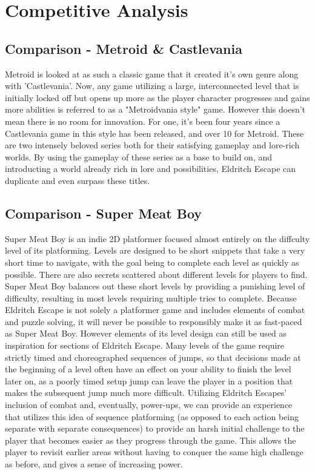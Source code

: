 \documentclass [12pt]{article}
\begin{document}
\section*{Competitive Analysis}

\subsection*{Comparison - Metroid & Castlevania}

Metroid is looked at as such a classic game that it created it's own genre along with 'Castlevania'. Now, any game utilizing a large, interconnected level that is initially locked off but opens up more as the player character progresses and gains more abilities is referred to as a "Metroidvania style" game. However this doesn't mean there is no room for innovation. For one, it's been four years since a Castlevania game in this style has been released, and over 10 for Metroid. These are two intensely beloved series both for their satisfying gameplay and lore-rich worlds. By using the gameplay of these series as a base to build on, and introducting a world already rich in lore and possibilities, Eldritch Escape can duplicate and even surpass these titles.

\subsection*{Comparison - Super Meat Boy}

Super Meat Boy is an indie 2D platformer focused almost entirely on the diffculty level of its platforming. Levels are designed to be short snippets that take a very short time to navigate, with the goal being to complete each level as quickly as possible. There are also secrets scattered about different levels for players to find. Super Meat Boy balances out these short levels by providing a punishing level of difficulty, resulting in most levels requiring multiple tries to complete. Because Eldritch Escape is not solely a platformer game and includes elements of combat and puzzle solving, it will never be possible to responsibly make it as fast-paced as Super Meat Boy. However elements of its level design can still be used as inspiration for sections of Eldritch Escape. Many levels of the game require strictly timed and choreographed sequences of jumps, so that decisions made at the beginning of a level often have an effect on your ability to finish the level later on, as a poorly timed setup jump can leave the player in a position that makes the subsequent jump much more difficult. Utilizing Eldritch Escapes' inclusion of combat and, eventually, power-ups, we can provide an experience that utilizes this idea of sequence platforming (as opposed to each action being separate with separate consequences) to provide an harsh initial challenge to the player that becomes easier as they progress through the game. This allows the player to revisit earlier areas without having to conquer the same high challenge as before, and gives a sense of increasing power.
\end{document}
